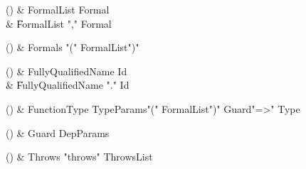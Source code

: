 \begin{bbgrammarappendix}{4.0in}

() & FormalList \label{prod:FormalList}  \: Formal  \\

 &    \| FormalList \xcd"," Formal \\

\end{bbgrammarappendix}

\begin{bbgrammarappendix}{4.3in}

() & Formals \label{prod:Formals}  \: \xcd"(" FormalList\opt \xcd")"  \\


\end{bbgrammarappendix}

\begin{bbgrammarappendix}{3.2in}

() & FullyQualifiedName \label{prod:FullyQualifiedName}  \: Id  \\

 &    \| FullyQualifiedName \xcd"." Id \\

\end{bbgrammarappendix}

\begin{bbgrammarappendix}{3.8in}

() & FunctionType \label{prod:FunctionType}  \: TypeParams\opt \xcd"(" FormalList\opt \xcd")" Guard\opt \xcd"=>" Type  \\


\end{bbgrammarappendix}

\begin{bbgrammarappendix}{4.5in}

() & Guard \label{prod:Guard}  \: DepParams  \\


\end{bbgrammarappendix}


\begin{bbgrammarappendix}{4.5in}

() & Throws \label{prod:Throws}  \: \xcd"throws" ThrowsList  \\

\end{bbgrammarappendix}

